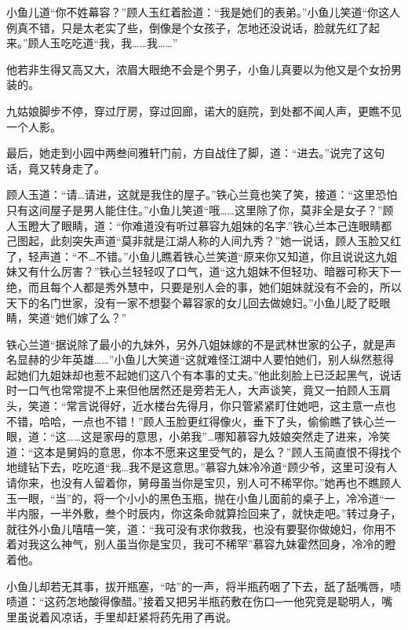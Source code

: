 \documentclass[12pt,oneside]{book}
\begin{document}
小鱼儿道``你不姓幕容？''顾人玉红着脸道：``我是她们的表弟。''小鱼儿笑道``你这人例真不错，只是太老实了些，倒像是个女孩子，怎地还没说话，脸就先红了起来。''顾人玉吃吃道``我，我\ldots\ldots 我\ldots\ldots{}''

他若非生得又高又大，浓眉大眼绝不会是个男子，小鱼儿真要以为他又是个女扮男装的。

九姑娘脚步不停，穿过厅房，穿过回廊，诺大的庭院，到处都不闻人声，更瞧不见一个人影。

最后，她走到小园中两叁间雅轩门前，方自战住了脚，道：``进去。''说完了这句话，竟又转身走了。

顾人玉道：``请\ldots 请进，这就是我住的屋子。''铁心兰竟也笑了笑，接道：``这里恐怕只有这间屋子是男人能住住。''小鱼儿笑道``哦\ldots\ldots 这里除了你，莫非全是女子？''顾人玉瞪大了眼睛，道：``你难道没有听过慕容九姐妹的名字.''铁心兰本己连眼睛都己图起，此刻突失声道``莫非就是江湖人称的人间九秀？''她一说话，顾人玉脸又红了，轻声道：``不\ldots 不错。''小鱼儿瞧着铁心兰笑道``原来你又知道，你且说说这九姐妹又有什么厉害？''铁心兰轻轻叹了口气，道``这九姐妹不但轻功、暗器可称天下一绝，而且每个人都是秀外慧中，只要是别人会的事，她们姐妹就没有不会的，所以天下的名门世家，没有一家不想娶个幕容家的女儿回去做媳妇。''小鱼儿眨了眨眼睛，笑道``她们嫁了么？''

铁心兰道``据说除了最小的九妹外，另外八姐妹嫁的不是武林世家的公子，就是声名显赫的少年英雄\ldots\ldots{}''小鱼儿大笑道``这就难怪江湖中人要怕她们，别人纵然惹得起她们九姐妹却也惹不起她们这八个有本事的丈夫。''他此刻脸上已泛起黑气，说话时一口气也常常提不上来但他居然还是旁若无人，大声谈笑，竟又一拍顾人玉肩头，笑道：``常言说得好，近水楼台先得月，你只管紧紧盯住她吧，这主意一点也不错，哈哈，一点也不错！''顾人玉脸更红得像火，垂下了头，偷偷瞧了铁心兰一眼，道：``这\ldots\ldots 这是家母的意思，小弟我''\ldots 哪知慕容九妓娘突然走了进来，冷笑道：``这本是舅妈的意思，你本不愿来这里受气的，是么？''顾人玉简直恨不得找个地缝钻下去，吃吃道``我\ldots 我不是这意思。''慕容九妹冷冷道``顾少爷，这里可没有人请你来，也没有人留着你，舅母虽当你是宝贝，别人可不稀罕你。''她再也不瞧顾人玉一眼，``当''的，将一个小小的黑色玉瓶，抛在小鱼儿面前的桌子上，冷冷道``一半内服，一半外敷，叁个时辰内，你这条命就算捡回来了，就快走吧。''转过身子，就往外小鱼儿嘻嘻一笑，道：``我可没有求你救我，也没有要娶你做媳妇，你用不着对我这么神气，别人虽当你是宝贝，我可不稀罕''慕容九妹霍然回身，冷冷的瞪着他。

小鱼儿却若无其事，拔开瓶塞，``咕''的一声，将半瓶药咽了下去，舐了舐嘴唇，啧啧道：``这药怎地酸得像醋。''接着又把另半瓶药敷在伤口─一他究竞是聪明人，嘴里虽说着风凉话，手里却赶紧将药先用了再说。
\end{document}
